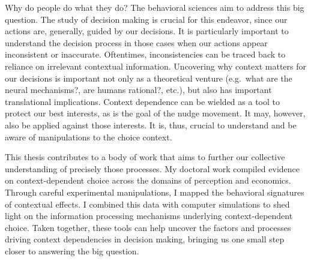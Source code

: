 \documentclass[a4paper, nobind]{templates/ociamthesis}
\newcommand*{\bibtitle}{References}
\begin{document}
Why do people do what they do? The behavioral sciences aim to address this big question. The study of decision making is crucial for this endeavor, since our actions are, generally, guided by our decisions. It is particularly important to understand the decision process in those cases when our actions appear inconsistent or inaccurate. Oftentimes, inconsistencies can be traced back to reliance on irrelevant contextual information. Uncovering why context matters for our decisions is important not only as a theoretical venture (e.g.~what are the neural mechanisms?, are humans rational?, etc.), but also has important translational implications. Context dependence can be wielded as a tool to protect our best interests, as is the goal of the nudge movement. It may, however, also be applied against those interests. It is, thus, crucial to understand and be aware of manipulations to the choice context.

This thesis contributes to a body of work that aims to further our collective understanding of precisely those processes. My doctoral work compiled evidence on context-dependent choice across the domains of perception and economics. Through careful experimental manipulations, I mapped the behavioral signatures of contextual effects. I combined this data with computer simulations to shed light on the information processing mechanisms underlying context-dependent choice. Taken together, these tools can help uncover the factors and processes driving context dependencies in decision making, bringing us one small step closer to answering the big question.


\setlength{\baselineskip}{0pt} %


{\renewcommand*\MakeUppercase[1]{#1}%
\printbibliography[heading=bibintoc,title={\bibtitle}]}
\end{document}
